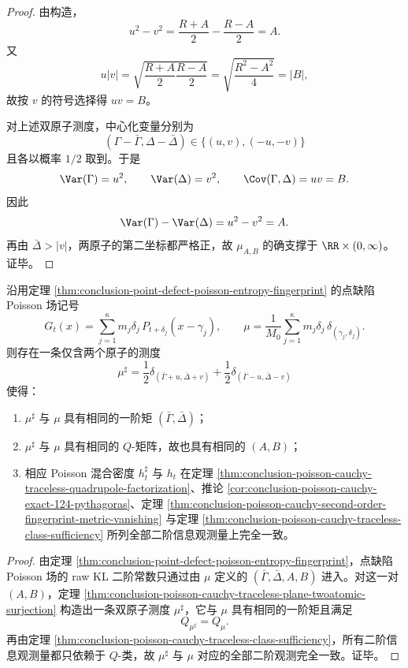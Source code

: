 \begin{proof}
由构造，
\[
u^2-v^2
=
\frac{R+A}{2}-\frac{R-A}{2}
=
A.
\]
又
\[
u|v|
=
\sqrt{\frac{R+A}{2}\frac{R-A}{2}}
=
\sqrt{\frac{R^2-A^2}{4}}
=
|B|,
\]
故按 \(v\) 的符号选择得 \(uv=B\)。

对上述双原子测度，中心化变量分别为
\[
(\Gamma-\bar\Gamma,\Delta-\bar\Delta)\in\{(u,v),(-u,-v)\}
\]
且各以概率 \(1/2\) 取到。于是
\[
\Var(\Gamma)=u^2,\qquad
\Var(\Delta)=v^2,\qquad
\Cov(\Gamma,\Delta)=uv=B.
\]
因此
\[
\Var(\Gamma)-\Var(\Delta)=u^2-v^2=A.
\]
再由 \(\bar\Delta>|v|\)，两原子的第二坐标都严格正，故 \(\mu_{A,B}\) 的确支撑于 \(\RR\times(0,\infty)\)。证毕。
\end{proof}

\begin{corollary}\label{cor:conclusion-point-defect-poisson-twoatomic-normal-form}
沿用定理 \ref{thm:conclusion-point-defect-poisson-entropy-fingerprint} 的点缺陷 Poisson 场记号
\[
G_t(x)=\sum_{j=1}^{\kappa}m_j\delta_j\,P_{t+\delta_j}(x-\gamma_j),
\qquad
\mu=\frac1{M_0}\sum_{j=1}^{\kappa}m_j\delta_j\,\delta_{(\gamma_j,\delta_j)}.
\]
则存在一条仅含两个原子的测度
\[
\mu^\sharp=
\frac12\delta_{(\bar\Gamma+u,\bar\Delta+v)}
+
\frac12\delta_{(\bar\Gamma-u,\bar\Delta-v)}
\]
使得：
\begin{enumerate}
  \item \(\mu^\sharp\) 与 \(\mu\) 具有相同的一阶矩 \((\bar\Gamma,\bar\Delta)\)；
  \item \(\mu^\sharp\) 与 \(\mu\) 具有相同的 \(Q\)-矩阵，故也具有相同的 \((A,B)\)；
  \item 相应 Poisson 混合密度 \(h_t^\sharp\) 与 \(h_t\) 在定理 \ref{thm:conclusion-poisson-cauchy-traceless-quadrupole-factorization}、推论 \ref{cor:conclusion-poisson-cauchy-exact-124-pythagoras}、定理 \ref{thm:conclusion-poisson-cauchy-second-order-fingerprint-metric-vanishing} 与定理 \ref{thm:conclusion-poisson-cauchy-traceless-class-sufficiency} 所列全部二阶信息观测量上完全一致。
\end{enumerate}
\end{corollary}

\begin{proof}
由定理 \ref{thm:conclusion-point-defect-poisson-entropy-fingerprint}，点缺陷 Poisson 场的 raw KL 二阶常数只通过由 \(\mu\) 定义的 \((\bar\Gamma,\bar\Delta,A,B)\) 进入。对这一对 \((A,B)\)，定理 \ref{thm:conclusion-poisson-cauchy-traceless-plane-twoatomic-surjection} 构造出一条双原子测度 \(\mu^\sharp\)，它与 \(\mu\) 具有相同的一阶矩且满足
\[
Q_{\mu^\sharp}=Q_\mu.
\]
再由定理 \ref{thm:conclusion-poisson-cauchy-traceless-class-sufficiency}，所有二阶信息观测量都只依赖于 \(Q\)-类，故 \(\mu^\sharp\) 与 \(\mu\) 对应的全部二阶观测完全一致。证毕。
\end{proof}

